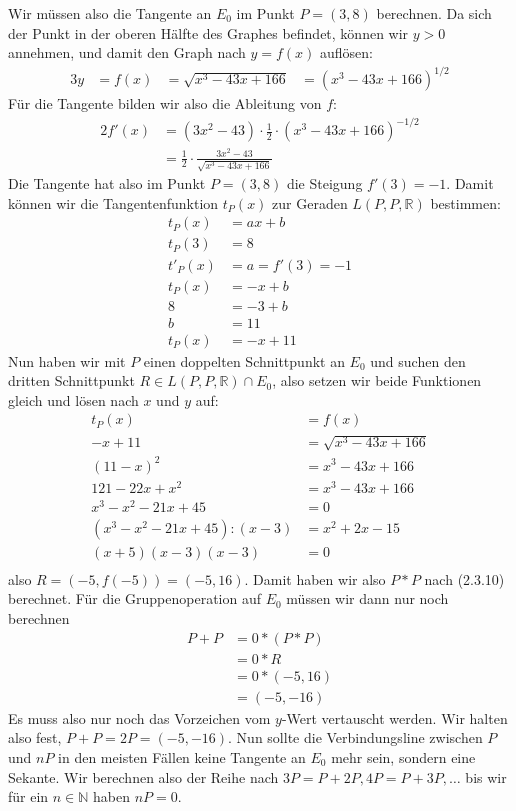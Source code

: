 \begin{enumerate}[label=\alph*)]
Wir müssen also die Tangente an $E_{0}$ im Punkt $P = (3, 8)$ berechnen. Da sich der Punkt in der oberen Hälfte des Graphes befindet,
können wir $y > 0$ annehmen, und damit den Graph nach $y = f(x)$ auflösen:
\begin{alignat*}{3}
y &= f(x) &= \sqrt{x^{3} - 43x + 166} &= (x^{3} - 43x + 166)^{1/2}
\end{alignat*}
Für die Tangente bilden wir also die Ableitung von $f$:
\begin{alignat*}{2}
f'(x) &= (3x^{2} - 43)\cdot \frac{1}{2} \cdot (x^{3} - 43x + 166)^{-1/2} \\
&= \frac{1}{2} \cdot \frac{3x^{2}-43}{\sqrt{x^{3}-43x+166}}
\end{alignat*}
Die Tangente hat also im Punkt $P = (3,8)$ die Steigung $f'(3) = -1$. Damit können wir die Tangentenfunktion
$t_{P}(x)$ zur Geraden $L(P,P,\mathbb{R})$ bestimmen:
\begin{align*}
t_{P}(x) &= ax + b \\
t_{P}(3) &= 8 \\
t'_{P}(x) &= a = f'(3) = -1 \\
t_{P}(x) &= -x + b \\
8 &= -3 + b \\
b &= 11 \\
t_{P}(x) &= -x + 11
\end{align*}
Nun haben wir mit $P$ einen doppelten Schnittpunkt an $E_{0}$ und suchen den dritten Schnittpunkt $R \in L(P,P,\mathbb{R}) \cap E_{0}$,
also setzen wir beide Funktionen gleich und lösen nach $x$ und $y$ auf:
\begin{align*}
t_{P}(x) &= f(x) \\
-x + 11 &= \sqrt{x^{3} - 43x + 166} \\
(11 - x)^{2} &= x^{3} - 43x + 166 \\
121 - 22x + x^{2} &= x^{3} -43x + 166 \\
x^{3} - x^{2} - 21x + 45 &= 0 \\
(x^{3} - x^{2} - 21x + 45) : (x - 3) &= x^{2} + 2x - 15 \\
(x+5)(x-3)(x-3) &= 0 \\
\end{align*}
also $R = (-5, f(-5)) = (-5, 16)$.
Damit haben wir also $P\ast P$ nach (2.3.10) berechnet. Für die Gruppenoperation auf $E_{0}$ müssen wir dann nur noch berechnen
\begin{align*}
P + P &= 0 \ast (P \ast P) \\
&= 0 \ast R \\
&= 0 \ast (-5, 16) \\
&= (-5, -16)
\end{align*}
Es muss also nur noch das Vorzeichen vom $y$-Wert vertauscht werden. Wir halten also fest, $P + P = 2P = (-5, -16)$.
Nun sollte die Verbindungsline zwischen $P$ und $nP$ in den meisten Fällen keine Tangente an $E_{0}$ mehr sein, sondern eine Sekante.
Wir berechnen also der Reihe nach $3P = P + 2P, 4P = P + 3P,\dots$ bis wir für ein $n \in \mathbb{N}$ haben $nP = 0$.


\end{enumerate}
